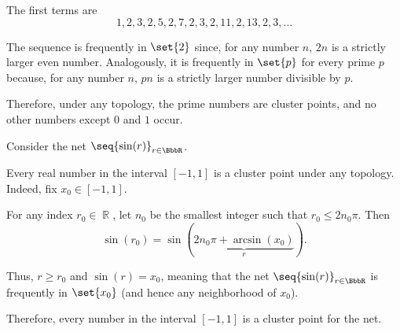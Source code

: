 \begin{example}
\begin{thmenum}
    The first terms are
    \begin{equation*}
      1, 2, 3, 2, 5, 2, 7, 2, 3, 2, 11, 2, 13, 2, 3, \ldots
    \end{equation*}

    The sequence is frequently in \( \set{ 2 } \) since, for any number \( n \), \( 2n \) is a strictly larger even number. Analogously, it is frequently in \( \set{ p } \) for every prime \( p \) because, for any number \( n \), \( pn \) is a strictly larger number divisible by \( p \).

    Therefore, under any topology, the prime numbers are cluster points, and no other numbers except \( 0 \) and \( 1 \) occur.

     Consider the net \( \seq{ \sin(r) }_{r \in \BbbR} \).

    Every real number in the interval \( [-1, 1] \) is a cluster point under any topology. Indeed, fix \( x_0 \in [-1, 1] \).

    For any index \( r_0 \in \BbbR \), let \( n_0 \) be the smallest integer such that \( r_0 \leq 2 n_0 \pi \). Then
    \begin{equation*}
      \sin(r_0) = \sin(\underbrace{2 n_0 \pi + \arcsin(x_0)}_r).
    \end{equation*}

    Thus, \( r \geq r_0 \) and \( \sin(r) = x_0 \), meaning that the net \( \seq{ \sin(r) }_{r \in \BbbR} \) is frequently in \( \set{ x_0 } \) (and hence any neighborhood of \( x_0 \)).

    Therefore, every number in the interval \( [-1, 1] \) is a cluster point for the net.
  \end{thmenum}
\end{example}

